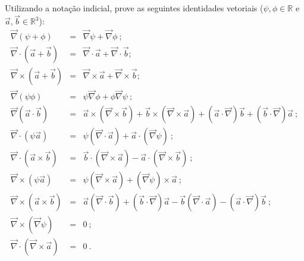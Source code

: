 \documentclass[a4paper,12pt]{article}
\begin{document}

\newpage



{}\\
\\
\\
\\

%

\indent \par Utilizando a notação indicial, prove as seguintes identidades vetoriais ($\psi , \phi \in \mathbb{R}$ e $\vec{a} , \vec{b} \in \mathbb{R}^{3}$):
%
\begin{eqnarray}
\nonumber
\vec{\nabla}(\psi + \phi) &=& \vec{\nabla}\psi + \vec{\nabla}\phi ~;\\
\nonumber
\vec{\nabla} \cdot (\vec{a}+\vec{b}) &=& \vec{\nabla} \cdot \vec{a} + \vec{\nabla} \cdot \vec{b};\\
\nonumber
\vec{\nabla} \times (\vec{a}+\vec{b}) &=& \vec{\nabla} \times \vec{a} + \vec{\nabla} \times \vec{b};\\
\nonumber
\vec{\nabla}(\psi\phi) &=& \psi \vec{\nabla}\phi + \phi \vec{\nabla}\psi ~;\\
\nonumber
\vec{\nabla} (\vec{a} \cdot \vec{b}) &=& \vec{a} \times (\vec{\nabla} \times \vec{b}) + \vec{b} \times (\vec{\nabla} \times \vec{a}) + (\vec{a} \cdot \vec{\nabla}) \vec{b} + (\vec{b} \cdot \vec{\nabla}) \vec{a} ~;\\
\nonumber
\vec{\nabla} \cdot (\psi\vec{a}) &=& \psi (\vec{\nabla}\cdot \vec{a}) + \vec{a} \cdot (\vec{\nabla}\psi) ~;\\
\nonumber
\vec{\nabla} \cdot (\vec{a} \times \vec{b}) &=& \vec{b} \cdot (\vec{\nabla} \times \vec{a}) - \vec{a} \cdot (\vec{\nabla} \times \vec{b}) ~;\\
\nonumber
\vec{\nabla} \times (\psi\vec{a}) &=& \psi (\vec{\nabla}\times \vec{a}) + (\vec{\nabla}\psi) \times \vec{a} ~;\\
\nonumber
\vec{\nabla} \times (\vec{a} \times \vec{b}) &=& \vec{a} (\vec{\nabla} \cdot \vec{b}) + (\vec{b} \cdot \vec{\nabla})\vec{a} - 
\vec{b} (\vec{\nabla} \cdot \vec{a}) - (\vec{a} \cdot \vec{\nabla})\vec{b} ~;\\
\nonumber
\vec{\nabla} \times (\vec{\nabla} \psi) &=& 0 ~;\\
\nonumber
\vec{\nabla} \cdot (\vec{\nabla} \times \vec{a}) &=& 0 ~.
\end{eqnarray}
\end{document}
